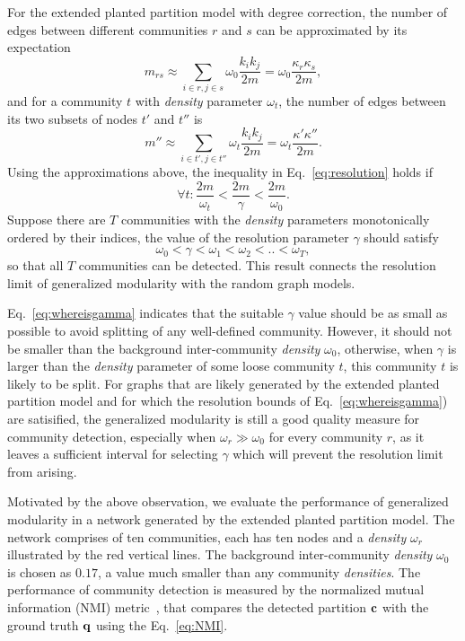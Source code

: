 For the extended planted partition model with degree correction, the number of edges between different communities $r$ and $s$ can be approximated by its expectation
\begin{equation} \label{eq:approx_out}
    m_{rs} \approx \sum_{i\in r,j\in s} \omega_0 \frac{k_i k_j}{2m} = \omega_0 \frac{\kappa_r \kappa_s}{2m},
\end{equation}
and for a community $t$ with {\it density} parameter $\omega_t$, the number of edges between its two subsets of nodes $t'$ and $t''$ is
\begin{equation} \label{eq:approx_in}
    m'' \approx \sum_{i\in t',j\in t''} \omega_t \frac{k_i k_j}{2m}= \omega_t \frac{\kappa' \kappa''}{2m}.
\end{equation}
Using the approximations above, the inequality in Eq.~\ref{eq:resolution} holds if
\begin{equation}
      \forall t : \frac{2m}{\omega_t} < \frac{2m}{\gamma} < \frac{2m}{\omega_0}.
\end{equation}
Suppose there are $T$ communities with the {\it density} parameters monotonically ordered by their indices, the value of the resolution parameter $\gamma$ should satisfy
\begin{equation} \label{eq:whereisgamma}
    \omega_0 < \gamma < \omega_1 < \omega_2 < .. < \omega_T,
\end{equation}
so that all $T$ communities can be detected. This result connects the resolution limit of generalized modularity with the random graph models.

Eq.~\ref{eq:whereisgamma} indicates that the suitable $\gamma$ value should be as small as possible to avoid splitting of any well-defined community. However, it should not be smaller than the background inter-community {\it density} $\omega_0$, otherwise, when $\gamma$ is larger than the {\it density} parameter of some loose community $t$, this community $t$ is likely to be split. For graphs that are likely generated by the extended planted partition model and for which the resolution bounds of Eq.~\ref{eq:whereisgamma}) are satisified, the generalized modularity is still a good quality measure for community detection, especially when $\omega_r \gg \omega_0$ for every community $r$, as it leaves a sufficient interval for selecting $\gamma$ which will prevent the resolution limit from arising. 

Motivated by the above observation, we evaluate the performance of generalized modularity in a network generated by the extended planted partition model. The network comprises of ten communities, each has ten nodes and a {\it density} $\omega_r$ illustrated by the red vertical lines. The background inter-community {\it density} $\omega_0$ is chosen as $0.17$, a value much smaller than any community {\it densities}. The performance of community detection is measured by the normalized mutual information (NMI) metric~\cite{wagner2007comparing}, that compares the detected partition $\bf c$ with the ground truth $\bf q$ using the Eq.~\ref{eq:NMI}.

